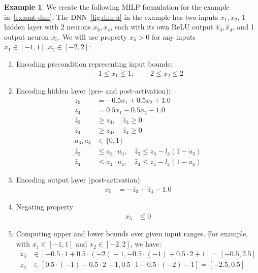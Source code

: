 \documentclass[oneside,11pt,dvipsnames]{book}
\numberwithin{equation}{section}
\theoremstyle{definition}
\newtheorem{example}{Example}[section]
\theoremstyle{remark}
\begin{document}
\begin{example}\label{ex:milp-dnn}
    We create the following MILP formulation for the example in~\autoref{ex:smt-dnn}. The DNN~\autoref{fig:dnn-a} in the example has two inputs $x_1, x_2$, 1 hidden layer with 2 neurons $x_3, x_4$, each with its own ReLU output $\hat{x}_3, \hat{x}_4$, and 1 output neuron $x_5$.
    We will use property $x_5 > 0$ for any inputs $x_1 \in [-1,1], x_2\in[-2,2]$:



\begin{enumerate}    
\item Encoding precondition representing input bounds:
\begin{align*}
-1 \le x_1 \le 1;\quad -2 \le x_2 \le 2
\end{align*}

\item Encoding hidden layer (pre- and post-activation): 
\begin{align*}
z_3 &= -0.5x_1 + 0.5x_2 + 1.0 \\
z_4 &= 0.5x_1 - 0.5x_2 - 1.0 \\
\hat{z}_3 &\ge z_3, \quad \hat{z}_3 \ge 0 \\
\hat{z}_4 &\ge z_4, \quad \hat{z}_4 \ge 0 \\
a_3, a_4 &\in \{0, 1\} \\
\hat{z}_3 &\le a_3 \cdot u_3, \quad \hat{z}_3 \le z_3 - l_3(1 - a_3) \\
\hat{z}_4 &\le a_4 \cdot u_4, \quad \hat{z}_4 \le z_4 - l_4(1 - a_4)
\end{align*}


\item Encoding output layer (post-activation):
\begin{align*}
x_5 &= -\hat{z}_3 + \hat{z}_4 - 1.0
\end{align*}

\item Negating property
\begin{align*}
x_5 &\le 0
\end{align*}

\item Computing upper and lower bounds over given input ranges. For example, with $x_1 \in [-1,1]$ and $x_2 \in [-2,2]$, we have: 
\begin{align*}
z_3 &\in [-0.5 \cdot 1 + 0.5 \cdot (-2) + 1, -0.5 \cdot (-1) + 0.5 \cdot 2 + 1] = [-0.5, 2.5] \\
z_4 &\in [0.5 \cdot (-1) - 0.5 \cdot 2 - 1, 0.5 \cdot 1 - 0.5 \cdot (-2) - 1] = [-2.5, 0.5]
\end{align*}


\end{enumerate}
\end{example}
\end{document}
